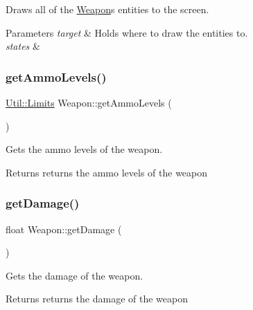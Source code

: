 Draws all of the \hyperlink{class_weapon}{Weapon}\textquotesingle{}s entities to the screen. 


\begin{DoxyParams}{Parameters}
{\em target} & Holds where to draw the entities to. \\
\hline
{\em states} & \\
\hline
\end{DoxyParams}
\mbox{\label{class_weapon_a834032aeb0af1f9226c7358b7567ded2}} 
\subsubsection{\texorpdfstring{get\+Ammo\+Levels()}{getAmmoLevels()}}
{\footnotesize\ttfamily \hyperlink{struct_util_1_1_limits}{Util\+::\+Limits} Weapon\+::get\+Ammo\+Levels (\begin{DoxyParamCaption}{ }\end{DoxyParamCaption})}



Gets the ammo levels of the weapon. 

\begin{DoxyReturn}{Returns}
returns the ammo levels of the weapon 
\end{DoxyReturn}
\mbox{\label{class_weapon_afa2f795037346203262b1dbf4c540a11}} 
\subsubsection{\texorpdfstring{get\+Damage()}{getDamage()}}
{\footnotesize\ttfamily float Weapon\+::get\+Damage (\begin{DoxyParamCaption}{ }\end{DoxyParamCaption})}



Gets the damage of the weapon. 

\begin{DoxyReturn}{Returns}
returns the damage of the weapon 
\end{DoxyReturn}
\mbox{\label{class_weapon_af088a7a4208b4b7d7ce8824c8ae73374}} 
